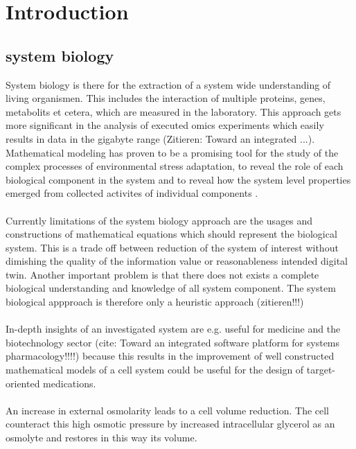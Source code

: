 \section{Introduction}
\pagestyle{headings}


\subsection{system biology}
System biology is there for the extraction of a system wide understanding of living organismen. This includes the interaction of multiple proteins, genes, metabolits et cetera, which are measured in the laboratory. This approach gets more significant in the analysis of executed omics experiments which easily results in data in the gigabyte range (Zitieren: Toward an integrated ...). Mathematical modeling has proven to be a promising tool for the study of the complex processes of environmental stress adaptation, to reveal the role of each biological component in the system and to reveal  how the system level properties emerged from collected activites of individual components \cite{Ke_2013}. \\\\
Currently limitations of the system biology approach are the usages and constructions of mathematical equations which should represent the biological system. This is a trade off between reduction of the system of interest without dimishing the quality of the information value or reasonableness intended digital twin. Another important problem is that there does not exists a complete biological understanding and knowledge of all system component. The system biological appproach is therefore only a heuristic approach (zitieren!!!) \\\\
In-depth insights of an investigated system are e.g. useful for medicine and the biotechnology sector (cite: Toward an integrated software platform for systems pharmacology!!!!) because this results in the improvement of  
well constructed mathematical models of a cell system could be useful for the design of target-oriented medications. \\\\
An increase in external osmolarity leads to a cell volume reduction. The cell counteract this high osmotic pressure by increased intracellular glycerol as an osmolyte and restores in this way its volume. \\



